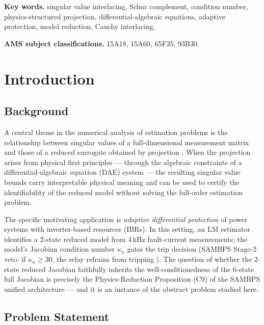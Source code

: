 \documentclass[11pt,a4paper]{article}
\theoremstyle{plain}
\theoremstyle{definition}
\theoremstyle{remark}
\newcommand{\kappan}{\kappa_{n}}
\begin{document}
\textbf{Key words.}
singular value interlacing, Schur complement, condition number,
physics-structured projection, differential-algebraic equations,
adaptive protection, model reduction, Cauchy interlacing.

\textbf{AMS subject classifications.}
15A18, 15A60, 65F35, 93B30.

\vspace{1em}

\section{Introduction}
\label{sec:intro}

\subsection{Background}

A central theme in the numerical analysis of estimation problems
is the relationship between singular values of a full-dimensional
measurement matrix and those of a reduced surrogate obtained by
projection \cite{Horn2013,Golub2013}.
When the projection arises from physical first principles --- through
the algebraic constraints of a differential-algebraic equation (DAE)
system --- the resulting singular value bounds carry interpretable
physical meaning and can be used to certify the identifiability
of the reduced model without solving the full-order estimation problem.

The specific motivating application is \emph{adaptive differential
protection} of power systems with inverter-based resources (IBRs).
In this setting, an LM estimator \cite{Marquardt1963} identifies
a 2-state reduced model from 4\,kHz fault-current measurements;
the model's Jacobian condition number $\kappan$ gates the trip
decision (SAMBPS Stage-2 veto: if $\kappan \geq 30$, the relay
refrains from tripping \cite{SAMBP_TR65}).
The question of whether the 2-state reduced Jacobian faithfully
inherits the well-conditionedness of the 6-state full Jacobian
is precisely the Physics-Reduction Proposition (C9) of the SAMBPS
unified architecture --- and it is an instance of the abstract
problem studied here.

\subsection{Problem Statement}
\end{document}
